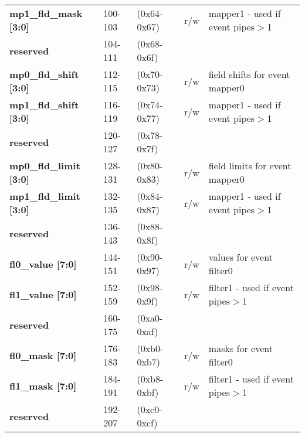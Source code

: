 \documentclass[11pt,a4paper,twoside]{article}
\begin{document}
\begin{center}
\begin{table}[!h]
\begin{tabularx}{\textwidth}{| p{37mm} p{13mm} p{21mm} p{6mm} X |}
		\textbf{mp1\_fld\_mask [3:0]}        & 100-103                    & (0x64-0x67)                    & r/w                 & mapper1 - used if event pipes$>$1 \\%
		\cellcolor{gray!25}\textbf{reserved} & \cellcolor{gray!25}104-111 & \cellcolor{gray!25}(0x68-0x6f) & \cellcolor{gray!25} & \cellcolor{gray!25}\\%
		\textbf{mp0\_fld\_shift [3:0]}       & 112-115                    & (0x70-0x73)                    & r/w                 & field shifts for event mapper0  \\%
		\textbf{mp1\_fld\_shift [3:0]}       & 116-119                    & (0x74-0x77)                    & r/w                 & mapper1 - used if event pipes$>$1  \\%
		\cellcolor{gray!25}\textbf{reserved} & \cellcolor{gray!25}120-127 & \cellcolor{gray!25}(0x78-0x7f) & \cellcolor{gray!25} & \cellcolor{gray!25}\\%
		\textbf{mp0\_fld\_limit [3:0]}       & 128-131                    & (0x80-0x83)                    & r/w                 & field limits for event mapper0  \\%
		\textbf{mp1\_fld\_limit [3:0]}       & 132-135                    & (0x84-0x87)                    & r/w                 & mapper1 - used if event pipes$>$1  \\%
		\cellcolor{gray!25}\textbf{reserved} & \cellcolor{gray!25}136-143 & \cellcolor{gray!25}(0x88-0x8f) & \cellcolor{gray!25} & \cellcolor{gray!25}\\%
		\textbf{fl0\_value [7:0]}            & 144-151                    & (0x90-0x97)                    & r/w                 & values for event filter0  \\%
		\textbf{fl1\_value [7:0]}            & 152-159                    & (0x98-0x9f)                    & r/w                 & filter1 - used if event pipes$>$1  \\%
		\cellcolor{gray!25}\textbf{reserved} & \cellcolor{gray!25}160-175 & \cellcolor{gray!25}(0xa0-0xaf) & \cellcolor{gray!25} & \cellcolor{gray!25}\\%
		\textbf{fl0\_mask [7:0]}             & 176-183                    & (0xb0-0xb7)                    & r/w                 & masks for event filter0  \\%
		\textbf{fl1\_mask [7:0]}             & 184-191                    & (0xb8-0xbf)                    & r/w                 & filter1 - used if event pipes$>$1  \\%
		\cellcolor{gray!25}\textbf{reserved} & \cellcolor{gray!25}192-207 & \cellcolor{gray!25}(0xc0-0xcf) & \cellcolor{gray!25} & \cellcolor{gray!25}  \\%

\end{tabularx}
\end{table}
\end{center}
\end{document}
